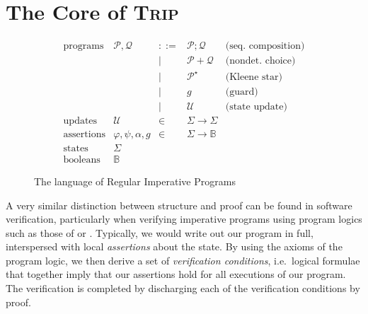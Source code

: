 \documentclass[sigplan]{acmart}%
\begin{document}
\section{The Core of \textsc{Trip}}\label{sec:core}
\begin{figure}
  $$
  \begin{array}{llclr}
   \text{programs}& \mathcal{P},\mathcal{Q} & ::= & \mathcal{P} ; \mathcal{Q} & \text{(seq. composition)} \\ 
                  &          &  |  & \mathcal{P} + \mathcal{Q} & \text{(nondet. choice)} \\
                  &          &  |  & \mathcal{P}^\star & \text{(Kleene star)} \\
                  &          &  |  & g & \text{(guard)} \\
                  &          &  |  & \mathcal{U} & \text{(state update)} \\
    \text{updates} & \mathcal{U} & \in & \Sigma \rightarrow \Sigma \\ 
    \text{assertions} & \varphi,\psi, \alpha, g  & \in & \Sigma \rightarrow \mathbb{B} \\ 
    \text{states} & \Sigma \\
    \text{booleans} & \mathbb{B}
  \end{array}
  $$
  \caption{The language of Regular Imperative Programs}
  \label{fig:rip}
\end{figure}
A very similar distinction between structure and proof can be found in software verification, 
particularly when verifying imperative programs using program logics such as those of 
\citet{floyd} or \citet{hoare}. Typically, we would write out our program in full, 
interspersed with local \emph{assertions} about the state. By using the axioms of the program logic, 
we then derive a set of \emph{verification conditions}, i.e.\ logical formulae that together imply that 
our assertions hold for all executions of our program. The verification is completed 
by discharging each of the verification conditions by proof.
\end{document}
